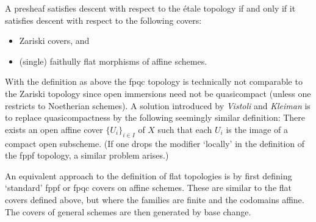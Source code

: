     \begin{property}
        A presheaf satisfies descent with respect to the \'etale topology if and only if it satisfies descent with respect to the following covers:
        \begin{itemize}
            \item Zariski covers, and
            \item (single) faithully flat morphisms of affine schemes.
        \end{itemize}
    \end{property}

    \begin{remark}
        With the definition as above the fpqc topology is technically not comparable to the Zariski topology since open immersions need not be quasicompact (unless one restricts to Noetherian schemes). A solution introduced by \textit{Vistoli} and \textit{Kleiman} is to replace quasicompactness by the following seemingly similar definition: There exists an open affine cover $\{U_i\}_{i\in I}$ of $X$ such that each $U_i$ is the image of a compact open subscheme. (If one drops the modifier `locally' in the definition of the fppf topology, a similar problem arises.)
    \end{remark}
    \begin{remark}
        An equivalent approach to the definition of flat topologies is by first defining `standard' fppf or fpqc covers on affine schemes. These are similar to the flat covers defined above, but where the families are finite and the codomains affine. The covers of general schemes are then generated by base change.
    \end{remark}

